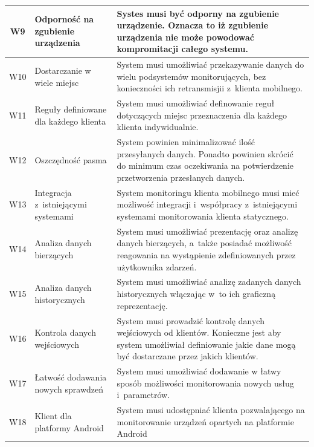 \begin{longtable}[c]{|c||p{3.5cm}|p{9cm}|}
  W9 & \raggedright{Odporność na zgubienie urządzenia} & \raggedright{Systes musi być odporny na zgubienie urządzenie. Oznacza to iż zgubienie urządzenia nie może powodować kompromitacji całego systemu.} \tabularnewline
  \hline

  W10 & \raggedright{Dostarczanie w wiele miejsc} & \raggedright{System musi umożliwiać przekazywanie danych do wielu podsystemów monitorujących, bez konieczności ich retransmisjii z~klienta mobilnego.} \tabularnewline
  \hline

  W11 & \raggedright{Reguły definiowane dla każdego klienta} & \raggedright{System musi umożliwiać definowanie reguł dotyczących miejsc przeznaczenia dla każdego klienta indywidualnie.} \tabularnewline
  \hline

  W12 & \raggedright{Oszczędność pasma} & \raggedright{System powinien minimalizować ilość przesyłanych danych. Ponadto powinien skrócić do minimum czas oczekiwania na potwierdzenie przetworzenia przesłanych danych.} \tabularnewline
  \hline

  W13 & \raggedright{Integracja z~istniejącymi systemami} & \raggedright{System monitoringu klienta mobilnego musi mieć możliwość integracji i~współpracy z~istniejącymi systemami monitorowania klienta statycznego.} \tabularnewline
  \hline

  W14 & \raggedright{Analiza danych bierzących} & \raggedright{System musi umożliwiać prezentację oraz analizę danych bierzących, a~także posiadać możliwość reagowania na wystąpienie zdefiniowanych przez użytkownika zdarzeń.} \tabularnewline
  \hline

  W15 & \raggedright{Analiza danych historycznych} & \raggedright{System musi umożliwiać analizę zadanych danych historycznych włączając w~to ich graficzną reprezentację.} \tabularnewline
  \hline

  W16 & \raggedright{Kontrola danych wejściowych} & \raggedright{System musi prowadzić kontrolę danych wejściowych od klientów. Konieczne jest aby system umożliwiał definiowanie jakie dane mogą być dostarczane przez jakich klientów.} \tabularnewline
  \hline

  W17 & \raggedright{Łatwość dodawania nowych sprawdzeń} & \raggedright{System musi umożliwiać dodawanie w łatwy sposób możliwości monitorowania nowych usług i~parametrów.} \tabularnewline
  \hline

  W18 & \raggedright{Klient dla platformy Android} & \raggedright{System musi udostępniać klienta pozwalającego na monitorowanie urządzeń opartych na platformie Android} \tabularnewline
  \hline


\end{longtable}
